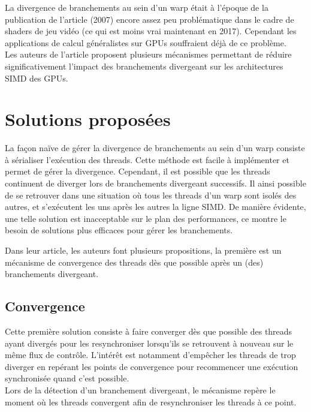 \documentclass[11pt]{article}
\begin{document}
La divergence de branchements au sein d'un warp était à l'époque de la publication de l'article (2007) encore assez peu problématique dans le cadre de shaders de jeu vidéo (ce qui est moins vrai maintenant en 2017). Cependant les applications de calcul généralistes sur GPUs souffraient déjà de ce problème.
\\Les auteurs de l'article proposent plusieurs mécanismes permettant de réduire significativement l'impact des branchements divergeant sur les architectures SIMD des GPUs.


\section{Solutions proposées}

La façon naïve de gérer la divergence de branchements au sein d'un warp consiste à sérialiser l'exécution des threads.
Cette méthode est facile à implémenter et permet de gérer la divergence.
Cependant, il est possible que les threads continuent de diverger lors de branchements divergeant successifs. Il ainsi possible de se retrouver dans une situation où tous les threads d'un warp sont isolés des autres, et s'exécutent les uns après les autres la ligne SIMD.
De manière évidente, une telle solution est inacceptable sur le plan des performances, ce montre le besoin de solutions plus efficaces pour gérer les branchements.

Dans leur article, les auteurs font plusieurs propositions, la première est un mécanisme de convergence des threads dès que possible après un (des) branchements divergeant.

\subsection{Convergence}

Cette première solution consiste à faire converger dès que possible des threads ayant divergés pour les resynchroniser lorsqu'ils se retrouvent à nouveau sur le même flux de contrôle.
L'intérêt est notamment d'empêcher les threads de trop diverger en repérant les points de convergence pour recommencer une exécution synchronisée quand c'est possible.
\\Lors de la détection d'un branchement divergeant, le mécanisme repère le moment où les threads convergent afin de resynchroniser les threads à ce point.
\end{document}
